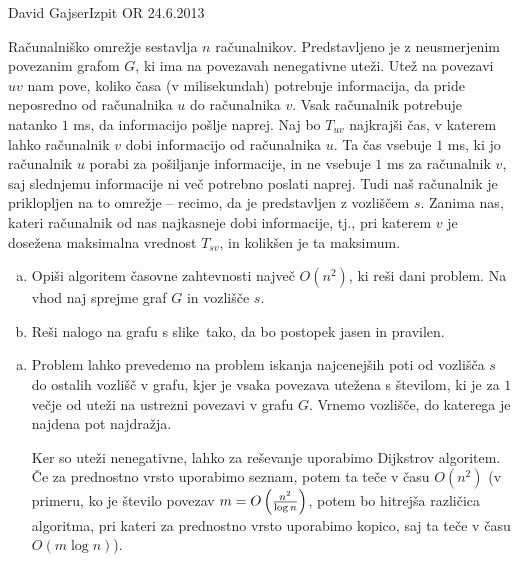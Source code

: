 \begin{naloga}{David Gajser}{Izpit OR 24.6.2013}
\begin{vprasanje}
Računalniško omrežje sestavlja $n$ računalnikov.
Predstavljeno je z neusmerjenim povezanim grafom $G$,
ki ima na povezavah nenegativne uteži.
Utež na povezavi $uv$ nam pove,
koliko časa (v milisekundah) potrebuje informacija,
da pride neposredno od računalnika $u$ do računalnika $v$.
Vsak računalnik potrebuje natanko $1$ ms, da informacijo pošlje naprej.
Naj bo $T_{uv}$ najkrajši čas,
v katerem lahko računalnik $v$ dobi informacijo od računalnika $u$.
Ta čas vsebuje $1$ ms, ki jo računalnik $u$ porabi za pošiljanje informacije,
in ne vsebuje $1$ ms za računalnik $v$,
saj slednjemu informacije ni več potrebno poslati naprej.
Tudi naš računalnik je priklopljen na to omrežje
-- recimo, da je predstavljen z vozliščem $s$.
Zanima nas, kateri računalnik od nas najkasneje dobi informacije,
tj., pri katerem $v$ je dosežena maksimalna vrednost $T_{sv}$,
in kolikšen je ta maksimum.

\begin{enumerate}[(a)]
\item Opiši algoritem časovne zahtevnosti največ $O(n^2)$,
ki reši dani problem.
Na vhod naj sprejme graf $G$ in vozlišče $s$.

\item Reši nalogo na grafu s slike~\fig tako,
da bo postopek jasen in pravilen.
\end{enumerate}

\begin{slika}
\pgfslika
{}
\end{slika}
\end{vprasanje}

\begin{odgovor}
\begin{enumerate}[(a)]
\item Problem lahko prevedemo
na problem iskanja najcenejših poti od vozlišča $s$ do ostalih vozlišč v grafu,
kjer je vsaka povezava utežena s številom,
ki je za $1$ večje od uteži na ustrezni povezavi v grafu $G$.
Vrnemo vozlišče, do katerega je najdena pot najdražja.

Ker so uteži nenegativne, lahko za reševanje uporabimo Dijkstrov algoritem.
Če za prednostno vrsto uporabimo seznam,
potem ta teče v času $O(n^2)$
(v primeru, ko je število povezav $m = O\left({n^2 \over \log n}\right)$,
potem bo hitrejša različica algoritma,
pri kateri za prednostno vrsto uporabimo kopico,
saj ta teče v času $O(m \log n)$).


\end{enumerate}
\end{odgovor}
\end{naloga}
